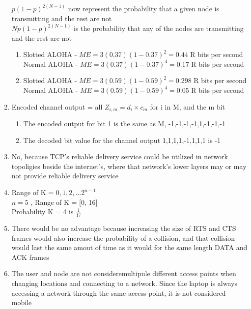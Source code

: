 \documentclass[14pt]{article}
\begin{document}
\begin{enumerate}
$p(1-p)^{2(N-1)}$ now represent the probability that a given node is transmitting and the rest are not \\
$Np(1-p)^{2(N-1)}$ is the probability that any of the nodes are transmitting and the rest are not

\begin{enumerate}[(1)]
\item 
Slotted ALOHA - $ME = 3(0.37)(1-0.37)^2 = 0.44$ R bits per second \\
Normal ALOHA - $ME = 3(0.37)(1-0.37)^4 = 0.17$ R bits per second

\item
Slotted ALOHA - $ME = 3(0.59)(1-0.59)^2 = 0.298$ R bits per second \\
Normal ALOHA - $ME = 3(0.59)(1-0.59)^4 = 0.05$ R bits per second
\end{enumerate}

\item
Encoded channel output = all $Z_{i,m} = d_i \times c_{m}$ for i in M, and the m bit
\begin{enumerate}[(1)]
\item
The encoded output for bit 1 is the same as M, -1,-1,-1,-1,1,-1,-1,-1 
\item
The decoded bit value for the channel output 1,1,1,1,-1,1,1,1 is -1

\end{enumerate}

\item
No, because TCP's reliable delivery service could be utilized in network topoligies beside the internet's, where that network's lower layers may or may not provide reliable delivery service

\item
Range of K = ${0,1,2,...2^{n-1}}$ \\
$n = 5$ , Range of K = [0, 16] \\
Probability K = 4 is $\frac{1}{17}$

\item
There would be no advantage because increasing the size of RTS and CTS frames would also increase the probability of a collision, and that collision would last the same amout of time as it would for the same length DATA and ACK frames

\item
The user and node are not consideremultipule different access points when changing locations and connecting to a network. Since the laptop is always accessing a network through the same access point, it is not considered mobile
\end{enumerate}
\end{document}
